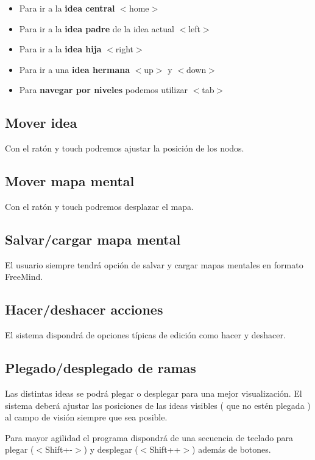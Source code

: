 \begin{itemize}
\item Para ir a la \textbf{idea central} $<$home$>$
\item Para ir a la \textbf{idea padre} de la idea actual $<$left$>$
\item Para ir a la \textbf{idea hija} $<$right$>$
\item Para ir a una \textbf{idea hermana} $<$up$>$ y $<$down$>$
\item Para \textbf{navegar por niveles} podemos utilizar $<$tab$>$
\end{itemize}

\subsection{Mover idea}
Con el ratón y touch podremos ajustar la posición de los nodos.

\subsection{Mover mapa mental}
Con el ratón y touch podremos desplazar el mapa.

\subsection{Salvar/cargar mapa mental}
El usuario siempre tendrá opción de salvar y cargar mapas mentales en formato FreeMind. 

\subsection{Hacer/deshacer acciones}
El sistema dispondrá de opciones típicas de edición como hacer y deshacer.

\subsection{Plegado/desplegado de ramas}
Las distintas ideas se podrá plegar o desplegar para una mejor visualización. El sistema deberá ajustar las posiciones de las ideas visibles ( que no estén plegada ) al campo de visión siempre que sea posible. 

Para mayor agilidad el programa dispondrá de una secuencia de teclado para plegar ($<$Shift+-$>$) y desplegar ($<$Shift++$>$) además de botones. 

